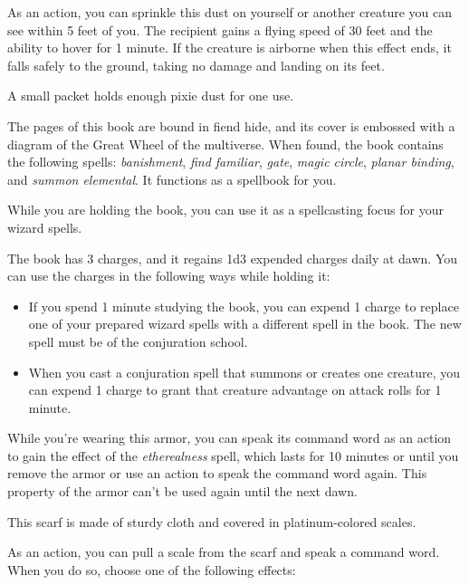 \documentclass[10pt,a4paper,twoside,bg=print,twocolumn,openany,nodeprecatedcode]{dndbook}
\begin{document}
As an action, you can sprinkle this dust on yourself or another creature you can see within 5 feet of you. The recipient gains a flying speed of 30 feet and the ability to hover for 1 minute. If the creature is airborne when this effect ends, it falls safely to the ground, taking no damage and landing on its feet.

A small packet holds enough pixie dust for one use.

The pages of this book are bound in fiend hide, and its cover is embossed with a diagram of the Great Wheel of the multiverse. When found, the book contains the following spells: \textit{banishment}, \textit{find familiar}, \textit{gate}, \textit{magic circle}, \textit{planar binding}, and \textit{summon elemental}. It functions as a spellbook for you.

While you are holding the book, you can use it as a spellcasting focus for your wizard spells.

The book has 3 charges, and it regains 1d3 expended charges daily at dawn. You can use the charges in the following ways while holding it:


\begin{itemize}
\item If you spend 1 minute studying the book, you can expend 1 charge to replace one of your prepared wizard spells with a different spell in the book. The new spell must be of the conjuration school.
\item When you cast a conjuration spell that summons or creates one creature, you can expend 1 charge to grant that creature advantage on attack rolls for 1 minute.
\end{itemize}

While you're wearing this armor, you can speak its command word as an action to gain the effect of the \textit{etherealness} spell, which lasts for 10 minutes or until you remove the armor or use an action to speak the command word again. This property of the armor can't be used again until the next dawn.

This scarf is made of sturdy cloth and covered in platinum-colored scales.

As an action, you can pull a scale from the scarf and speak a command word. When you do so, choose one of the following effects:
\end{document}
